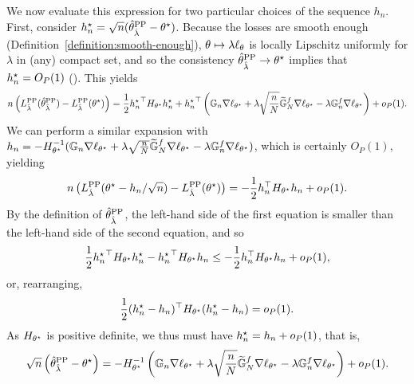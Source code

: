 We now evaluate this expression for two particular choices of the sequence
$h_n$. First, consider $h_n^\star = \sqrt{n}(\hat{\theta}^{\mathrm{PP}}_{\hat\lambda} -
\theta^\star)$.  Because the losses are smooth enough
(Definition~\ref{definition:smooth-enough}), $\theta \mapsto \lambda
\ell_\theta$ is locally Lipschitz uniformly for $\lambda$ in (any) compact set,
and so the consistency $\hat{\theta}^{\mathrm{PP}}_{\hat\lambda}\to \theta^\star$ implies that
$h_n^\star = O_P(1)$ (\citet[Corollary 5.53]{VanDerVaart98}).
This yields
\begin{equation*}
  n \left(L^{\mathrm{PP}}_{\hat\lambda}(\hat{\theta}^{\mathrm{PP}}_{\hat\lambda}) - L^{\mathrm{PP}}_{\hat\lambda}(\theta^\star)\right) = \frac{1}{2} {h_n^\star}^\top H_{\theta^\star} h_n^\star + {h_n^\star} ^\top \left(\mathbb{G}_n \nabla\ell_{\theta^\star} + \lambda\sqrt{\frac{n}{N}} \widetilde {\mathbb{G}}_N^f \nabla\ell_{\theta^\star} - \lambda \mathbb{G}_n^f \nabla\ell_{\theta^\star}\right) + o_P(1).
\end{equation*}
We can perform a similar expansion with
$h_n = -H_{\theta^\star}^{-1}
(\mathbb{G}_n \nabla\ell_{\theta^\star} + \lambda \sqrt{\frac{n}{N}} \widetilde
{\mathbb{G}}_N^f \nabla\ell_{\theta^\star} - \lambda \mathbb{G}_n^f
\nabla\ell_{\theta^\star})$, which is certainly $O_P(1)$,
yielding
\begin{equation*}
  n \left(L^{\mathrm{PP}}_{\hat\lambda}(\theta^\star -h_n/\sqrt{n}) - L^{\mathrm{PP}}_{\hat\lambda}(\theta^\star)\right)
  = -\frac{1}{2} h_n^\top H_{\theta^\star} h_n + o_P(1).
\end{equation*}
By the definition of $\hat{\theta}^{\mathrm{PP}}_{\hat\lambda}$, the left-hand side of the
first equation is smaller than the left-hand side of the second equation,
and so
\begin{align*}
  \frac{1}{2} {h_n^\star}^\top H_{\theta^\star} h_n^\star
  - {h_n^\star}^\top H_{\theta^\star} h_n
  \le - \frac{1}{2} h_n^\top H_{\theta^\star} h_n + o_P(1),
\end{align*}
or, rearranging,
\begin{equation*}
  \frac{1}{2} (h_n^\star - h_n)^\top H_{\theta^\star} (h_n^\star - h_n)
  = o_P(1).
\end{equation*}
As $H_{\theta^\star}$ is positive definite, we thus must have
$h_n^\star = h_n + o_P(1)$, that is,
\begin{equation*}
  \sqrt{n} \left(\hat{\theta}^{\mathrm{PP}}_{\hat\lambda} - \theta^\star\right)
  = -H_{\theta^\star}^{-1} \left(\mathbb{G}_n \nabla \ell_{\theta^\star}
  + \lambda \sqrt{\frac{n}{N}} \widetilde{\mathbb{G}}_N^f \nabla \ell_{\theta^\star}
  - \lambda \mathbb{G}_n^f \nabla \ell_{\theta^\star}\right) + o_P(1).
\end{equation*}

